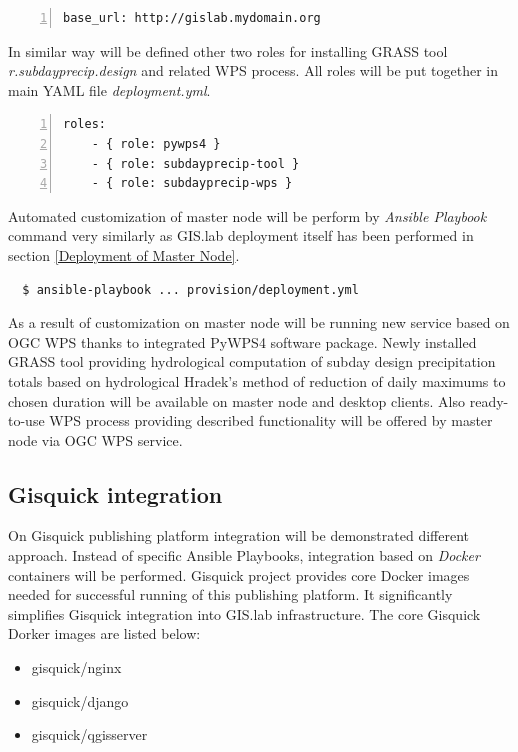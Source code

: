 \documentclass{isprs}
\begin{document}
\begin{lstlisting}[numbers=left,xleftmargin=1em]
base_url: http://gislab.mydomain.org
\end{lstlisting}

In similar way will be defined other two roles for installing GRASS
tool \textit{r.subdayprecip.design} and related WPS process. All roles
will be put together in main YAML file \textit{deployment.yml}.

\begin{lstlisting}[numbers=left,xleftmargin=1em]
roles:
    - { role: pywps4 }
    - { role: subdayprecip-tool }
    - { role: subdayprecip-wps }
\end{lstlisting}

Automated customization of master node will be perform by
\textit{Ansible Playbook} command very similarly as GIS.lab deployment
itself has been performed in section \ref{Deployment of Master Node}.

\begin{lstlisting}
  $ ansible-playbook ... provision/deployment.yml
\end{lstlisting}

As a result of customization on master node will be running new
service based on OGC WPS thanks to integrated PyWPS4 software
package. Newly installed GRASS tool providing hydrological computation
of subday design precipitation totals based on hydrological Hradek's
method of reduction of daily maximums to chosen duration will be
available on master node and desktop clients. Also ready-to-use WPS
process providing described functionality will be offered by master
node via OGC WPS service.

\subsection{Gisquick integration}

On Gisquick publishing platform integration will be demonstrated
different approach. Instead of specific Ansible Playbooks, integration
based on \textit{Docker} containers will be performed. Gisquick
project provides core Docker images needed for successful running of
this publishing platform. It significantly simplifies Gisquick
integration into GIS.lab infrastructure. The core Gisquick Dorker
images are listed below:

\begin{itemize}
\setlength\itemsep{0em}\setlength\parskip{0em}\setlength\topsep{0em}\setlength\partopsep{0em}\setlength\parsep{0em}
\item{gisquick/nginx}
\item{gisquick/django}
\item{gisquick/qgisserver}
\end{itemize}
\end{document}
